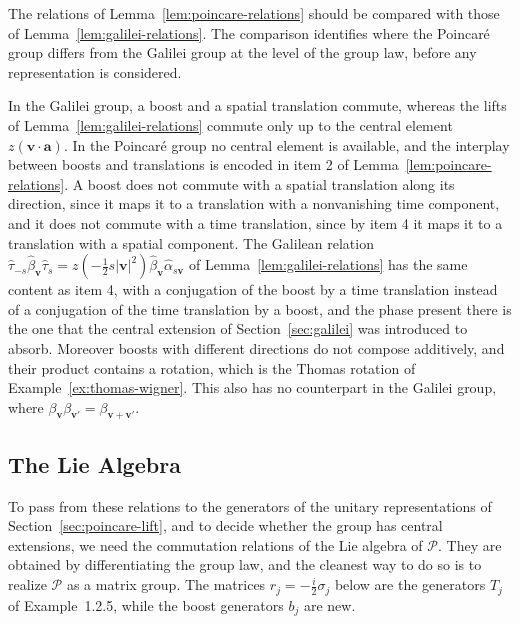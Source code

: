 	The relations of Lemma~\ref{lem:poincare-relations} should be compared with those of Lemma~\ref{lem:galilei-relations}. The comparison identifies where the Poincar\'e group differs from the Galilei group at the level of the group law, before any representation is considered.
	
	\begin{remark}\label{rem:poincare-vs-galilei}
		In the Galilei group, a boost and a spatial translation commute, whereas the lifts of Lemma~\ref{lem:galilei-relations} commute only up to the central element $z(\mathbf{v}\cdot\mathbf{a})$. In the Poincar\'e group no central element is available, and the interplay between boosts and translations is encoded in item 2 of Lemma~\ref{lem:poincare-relations}. A boost does not commute with a spatial translation along its direction, since it maps it to a translation with a nonvanishing time component, and it does not commute with a time translation, since by item 4 it maps it to a translation with a spatial component. The Galilean relation $\hat\tau_{-s}\hat\beta_{\mathbf{v}}\hat\tau_s=z(-\tfrac12s|\mathbf{v}|^2)\hat\beta_{\mathbf{v}}\hat\alpha_{s\mathbf{v}}$ of Lemma~\ref{lem:galilei-relations} has the same content as item 4, with a conjugation of the boost by a time translation instead of a conjugation of the time translation by a boost, and the phase present there is the one that the central extension of Section~\ref{sec:galilei} was introduced to absorb. Moreover boosts with different directions do not compose additively, and their product contains a rotation, which is the Thomas rotation of Example~\ref{ex:thomas-wigner}. This also has no counterpart in the Galilei group, where $\beta_{\mathbf{v}}\beta_{\mathbf{v}'}=\beta_{\mathbf{v}+\mathbf{v}'}$.
	\end{remark}
	
	\subsection*{The Lie Algebra}
	
	To pass from these relations to the generators of the unitary representations of Section~\ref{sec:poincare-lift}, and to decide whether the group has central extensions, we need the commutation relations of the Lie algebra of $\mathcal{P}$. They are obtained by differentiating the group law, and the cleanest way to do so is to realize $\mathcal{P}$ as a matrix group. The matrices $r_j=-\tfrac i2\sigma_j$ below are the generators $T_j$ of Example~1.2.5, while the boost generators $b_j$ are new.
	
